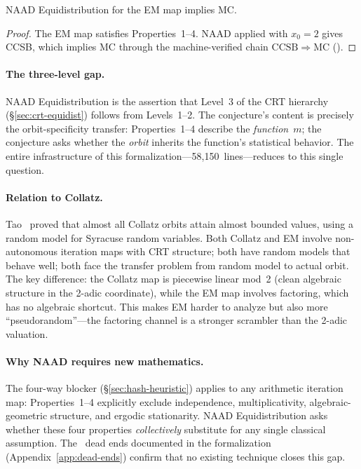 \begin{theorem}
NAAD Equidistribution for the EM map implies MC.
\end{theorem}

\begin{proof}
The EM map satisfies Properties~1--4.  NAAD applied with $x_0 = 2$
gives CCSB, which implies MC through the machine-verified chain
$\mathrm{CCSB} \Rightarrow \mathrm{MC}$
().
\end{proof}

\paragraph{The three-level gap.}
NAAD Equidistribution is the assertion that Level~3 of the CRT
hierarchy (\S\ref{sec:crt-equidist}) follows from Levels~1--2.
The conjecture's content is precisely the orbit-specificity
transfer: Properties~1--4 describe the \emph{function}~$m$;
the conjecture asks whether the \emph{orbit} inherits the function's
statistical behavior.  The entire infrastructure of this
formalization---58{,}150~lines---reduces to this single question.

\paragraph{Relation to Collatz.}
Tao~\cite{Tao2019Collatz} proved that almost all Collatz orbits attain almost
bounded values, using a random model for Syracuse random variables.
Both Collatz and EM involve non-autonomous iteration maps with CRT
structure; both have random models that behave well; both face the
transfer problem from random model to actual orbit.  The key
difference: the Collatz map is piecewise linear mod~2 (clean
algebraic structure in the 2-adic coordinate), while the EM map
involves factoring, which has no algebraic shortcut.  This makes EM
harder to analyze but also more ``pseudorandom''---the factoring
channel is a stronger scrambler than the 2-adic valuation.

\paragraph{Why NAAD requires new mathematics.}
The four-way blocker (\S\ref{sec:hash-heuristic}) applies to any
arithmetic iteration map: Properties~1--4 explicitly exclude
independence, multiplicativity, algebraic-geometric structure, and
ergodic stationarity.  NAAD Equidistribution asks whether these four
properties \emph{collectively} substitute for any single classical
assumption.  The \DEentries~dead ends documented in the formalization
(Appendix~\ref{app:dead-ends}) confirm that no existing technique
closes this gap.

